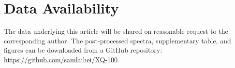 \documentclass[fleqn,usenatbib]{mnras}
\begin{document}
\section*{Data Availability}
The data underlying this article will be shared on reasonable request to the corresponding author. The post-processed spectra, supplementary table, and figures can be downloaded from a GitHub repository: \href{https://github.com/samlaihei/XQ-100}{https://github.com/samlaihei/XQ-100}. 











\appendix
\end{document}
